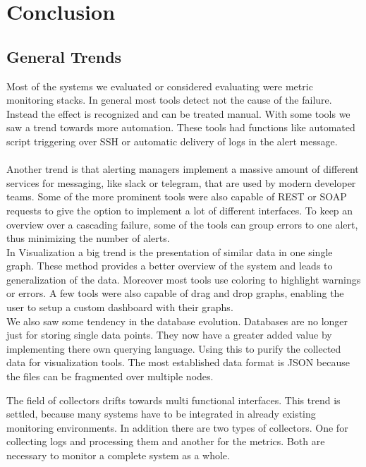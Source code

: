 
\chapter{Conclusion}\label{chap:conclusion}
\section{General Trends}
Most of the systems we evaluated or considered evaluating were metric monitoring stacks. In general most tools detect not the cause of the failure. Instead the effect is recognized and can be treated manual. With some tools we saw a trend towards more automation. These tools had functions like automated script triggering over SSH or automatic delivery of logs in the alert message. \\
\\
Another trend is that alerting managers implement a massive amount of different services for messaging, like slack or telegram, that are used by modern developer teams. Some of the more prominent tools were also capable of REST or SOAP requests to give the option to implement a lot of different interfaces. To keep an overview over a cascading failure, some of the tools can group errors to one alert, thus minimizing the number of alerts.
\\
In Visualization a big trend is the presentation of similar data in one single graph. These method provides a better overview of the system and leads to generalization of the data. Moreover most tools use coloring to highlight warnings or errors. A few tools were also capable of drag and drop graphs, enabling the user to setup a custom dashboard with their graphs.
\\
We also saw some tendency in the database evolution. Databases are no longer just for storing single data points. They now have a greater added value by implementing there own querying language. Using this to purify the collected data for visualization tools. The most established data format is JSON because the files can be fragmented over multiple nodes.

The field of collectors drifts towards multi functional interfaces. This trend is settled, because many systems have to be integrated in already existing monitoring environments. In addition there are two types of collectors. One for collecting logs and processing them and another for the metrics. Both are necessary to monitor a complete system as a whole.

